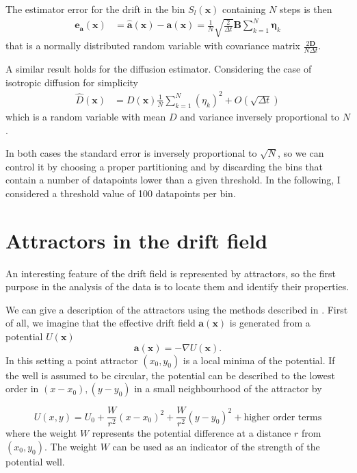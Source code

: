 \documentclass[a4paper]{article}
\begin{document}
The estimator error for the drift in the bin $S_l(\bm{x})$ containing $N$ steps is then
\begin{align}
\bm{e_a}(\bm{x}) &= \hat{\bm{a}}(\bm{x}) - \bm{a}(\bm{x}) = \frac{1}{N} \sqrt{\frac{2}{\Delta t}} \bm{B} \sum_{k = 1}^N \bm{\eta}_k
\end{align}
that is a normally distributed random variable with covariance matrix $\frac{2 \bm{D}}{N \Delta t}$.

A similar result holds for the diffusion estimator. Considering the case of isotropic diffusion for simplicity
\begin{align}
\hat{D}(\bm{x}) &= D(\bm{x}) \frac{1}{N} \sum_{k = 1}^N \left(\eta_k\right)^2 + O(\sqrt{\Delta t})
\end{align}
which is a random variable with mean $D$ and variance inversely proportional to $N$.

In both cases the standard error is inversely proportional to $\sqrt{N}$, so we can control it by choosing a proper partitioning and by discarding the bins that contain a number of datapoints lower than a given threshold. In the following, I considered a threshold value of 100 datapoints per bin.


\section{Attractors in the drift field}

An interesting feature of the drift field is represented by attractors, so the first purpose in the analysis of the data is to locate them and identify their properties.

We can give a description of the attractors using the methods described in \cite{hoze2012}. First of all, we imagine that the effective drift field $\bm{a}(\bm{x})$ is generated from a potential $U(\bm{x})$
\begin{equation} \label{eq:conservative}
\bm{a}(\bm{x}) = -\nabla U(\bm{x}).
\end{equation}
In this setting a point attractor $(x_0, y_0)$ is a local minima of the potential. If the well is assumed to be circular, the potential can be described to the lowest order in $(x - x_0), (y - y_0)$ in a small neighbourhood of the attractor by

\begin{equation} \label{eq:well}
U(x, y) = U_0 + \frac{W}{r^2}\left(x - x_0\right)^2 + \frac{W}{r^2}\left(y - y_0\right)^2 + \text{higher order terms}
\end{equation}
where the weight $W$ represents the potential difference at a distance $r$ from $(x_0, y_0)$. The weight $W$ can be used as an indicator of the strength of the potential well.
\end{document}
